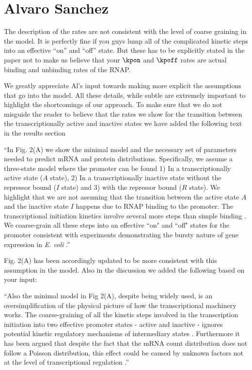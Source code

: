 \section{Alvaro Sanchez}

\begin{tcolorbox}
The description of the rates are not consistent with the level of coarse
graining in the model. It is perfectly fine if you guys lump all of the
complicated kinetic steps into an effective ``on'' and ``off'' state. But these
has to be explicitly stated in the paper not to make us believe that your
$\kpon$ and $\kpoff$ rates are actual binding and unbinding rates of the RNAP.
\end{tcolorbox}

We greatly appreciate Al's input towards making more explicit the assumptions
that go into the model. All these details, while subtle are extremely important
to highlight the shortcomings of our approach. To make sure that we do not
misguide the reader to believe that the rates we show for the transition between
the transcriptionally active and inactive states we have added the following
text in the results section

``In Fig. 2(A) we show the minimal model and the necessary set of parameters
needed to predict mRNA and protein distributions. Specifically, we assume a
three-state model where the promoter can be found 1) In a transcriptionally
active state ($A$ state), 2) In a transcriptionally inactive state without the
repressor bound ($I$ state) and 3) with the repressor bound ($R$ state). We
highlight that we are not assuming that the transition between the active state
$A$ and the inactive state $I$ happens due to RNAP binding to the promoter. The
transcriptional initiation kinetics involve several more steps than simple
binding \cite{Browning2004}. We coarse-grain all these steps into an effective
``on" and ``off" states for the promoter consistent with experiments
demonstrating the bursty nature of gene expression in {\it E. coli}
\cite{Golding2005}.''

Fig. 2(A) has been accordingly updated to be more consistent with this
assumption in the model. Also in the discussion we added the following based on
your input:

``Also the minimal model in Fig 2(A), despite being widely used, is an
oversimplification of the physical picture of how the transcriptional machinery
works. The coarse-graining of all the kinetic steps involved in the
transcription initiation into two effective promoter states - active and
inactive - ignores potential kinetic regulatory mechanisms of intermediary
states \cite{Scholes2017}. Furthermore it has been argued that despite the fact
that the mRNA count distribution does not follow a Poisson distribution, this
effect could be caused by unknown factors not at the level of transcriptional
regulation \cite{Choubey2018}.''
